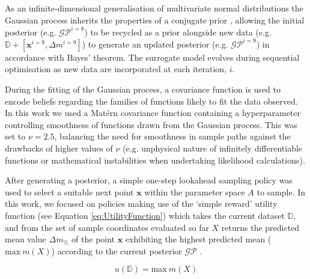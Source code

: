 As an infinite-dimensional generalisation of multivariate normal
 distributions the Gaussian process inherits the properties of a conjugate
 prior \autocite{Deisenroth2020}, allowing the initial posterior
 (e.g. \(\mathcal{GP}^{i=8}\)) to be recycled as a prior alongside new
 data (e.g. \(\mathbb{D}+[\mathbf{x}^{i=9},\Delta m^{i=9}]\)) to generate
 an updated posterior (e.g. \(\mathcal{GP}^{i=9}\)) in accordance
 with Bayes' theorem.
The surrogate model evolves during sequential optimisation as new data 
 are incorporated at each iteration, \(i\).

During the fitting of the Gaussian process, a covariance function is used to
 encode beliefs regarding the families of functions likely to fit the
 data observed.
In this work we used a Mat\'ern covariance function containing a 
hyperparameter controlling smoothness of functions drawn from the 
Gaussian process.
This was set to \(\nu=2.5\), balancing the need
 for smoothness in sample paths against the drawbacks of higher 
 values of \(\nu\) (e.g. unphysical nature of infinitely 
 differentiable functions or mathematical instabilities when
 undertaking likelihood calculations).

After generating a posterior, a simple one-step lookahead sampling
 policy was used to select a suitable next point \(\mathbf{x}\) within the
 parameter space \(A\) to sample.
In this work, we focused on policies making use of the `simple reward'
 utility function (see Equation \ref{eq:UtilityFunction}) which takes the
 current dataset \(\mathbb{D}\), and from the set of sample coordinates
 evaluated so far \(X\) returns the predicted mean value \(\Delta m_{\%}\)
 of the point \(\mathbf{x}\) exhibiting the highest predicted mean
 (\(\mathrm{max}\ m(X)\)) according to the current posterior \(\mathcal{GP}\)
 \autocite{Garnett2023}.

\begin{equation}\label{eq:UtilityFunction}
    u(\mathbb{D})=\mathrm{max}\ m(X)
\end{equation}

